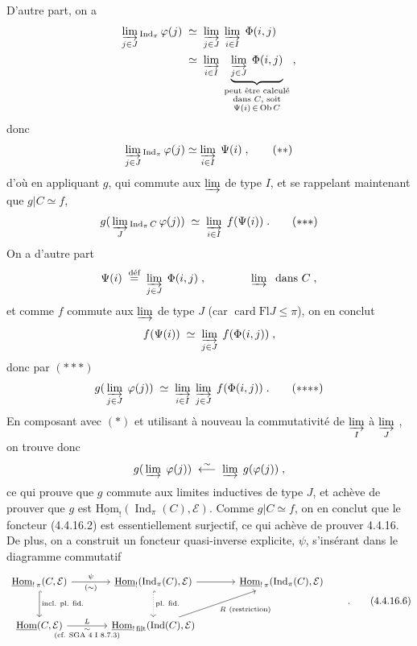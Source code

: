 \documentclass[11pt]{article}
\newcommand{\msp}[1]{\marginpar{\footnotesize [#1]}}
\newcommand{\Ind}{\operatorname{Ind}}
\newcommand{\uHom}{\underline{\mathrm{Hom}}}
\newcommand{\Ob}{\operatorname{Ob}}
\newcommand{\card}{\operatorname{card}}
\newcommand{\Fl}{\mathrm{Fl}}
\begin{document}
D'autre part, on a
\[
\begin{aligned}
\varinjlim_{j\in J}{}_{\Ind_\pi}\,\varphi(j)\;&\simeq\;\varinjlim_{j\in J}\;\varinjlim_{i\in I}\;\Phi(i,j)\\
&\simeq\;\varinjlim_{i\in I}\;\underbrace{\varinjlim_{j\in J}\;\Phi(i,j)}_{\substack{\text{peut être calculé}\\ \text{dans $C$, soit}\\ \Psi(i)\,\in\,\Ob C}}\;,
\end{aligned}
\]
donc
\[
\varinjlim_{j\in J}{}_{\Ind_\pi}\,\varphi(j)\simeq\varinjlim_{i\in I}\;\Psi(i)\;, \tag*{$(**)$}
\]
\msp{page 105}
d'où en appliquant $g$, qui commute aux $\varinjlim$ de type $I$, et se rappelant maintenant que $g|C\simeq f$,
\[
g(\,\varinjlim_{J}{}_{\Ind_\pi C}\,\varphi(j))\;\simeq\;\varinjlim_{i\in I}\;f(\Psi(i))\;. \tag*{$(*{*}*)$}
\]
On a d'autre part
\[
\Psi(i)\;\overset{\text{déf}}{=}\;\varinjlim_{j\in J}\;\Phi(i,j)\;,\qquad\qquad \varinjlim\;\text{ dans } C\;,
\]
et comme $f$ commute aux $\varinjlim$ de type $J$ (car $\card\Fl J\leqslant\pi$), on en conclut
\[
f(\Psi(i))\;\simeq\;\varinjlim_{j\in J}\;f(\Phi(i,j))\;,
\]
donc par $(*{*}*)$
\[
g(\,\varinjlim_{j\in J}\;\varphi(j))\;\simeq\;\varinjlim_{i\in I}\;\varinjlim_{j\in J}\;f(\Phi(i,j))\;. \tag*{$(*{*}{*}*)$}
\]
En composant avec $(*)$ et utilisant à nouveau la commutativité de $\varinjlim\limits_{I}$ à $\varinjlim\limits_{J}$ , on trouve donc
\[
g(\,\varinjlim\;\varphi(j))\;\overset{\sim}{\longleftarrow}\;\varinjlim\;g(\varphi(j))\;,
\]
ce qui prouve que $g$ commute aux limites inductives de type $J$, et achève de prouver que $g$ est $\uHom_{!}(\Ind_\pi(C),\mathcal{E})$. Comme $g|C\simeq f$, on en conclut que le foncteur (4.4.16.2) est essentiellement surjectif, ce qui achève de prouver 4.4.16. De plus, on a construit un foncteur quasi-inverse explicite, $\psi$,
\msp{page 106}
s'insérant dans le diagramme commutatif
\[
\begin{tikzcd}[column sep=large, row sep=large]
\uHom_{!\,\pi}(C,\mathcal{E}) \arrow[r, "\psi", "(\sim)"'] \arrow[d, hook, "\text{incl. pl. fid.}"] & \uHom_{!}(\Ind_\pi(C),\mathcal{E}) \arrow[r] \arrow[d, hook, dotted, "\text{pl. fid.}"] & \uHom_{!\,\pi}(\Ind_\pi(C),\mathcal{E}) \\
\uHom(C,\mathcal{E}) \arrow[r, "L", "\substack{\sim\\ \text{(cf. SGA 4 I 8.7.3)}}"'] & \uHom_{!\,\mathrm{filt}}(\Ind(C),\mathcal{E}) \arrow[ur, "R\ \text{(restriction)}"'] &
\end{tikzcd}
\qquad.
\tag*{(4.4.16.6)} %
\]
\end{document}
